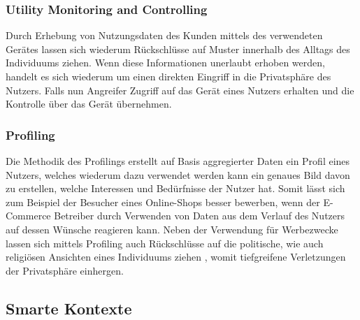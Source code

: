 \subsubsection{Utility Monitoring and Controlling}
\label{sec:Grundlagen:ssec:Gefahren für die Privatsphäre:sssec:Monitoring}

Durch Erhebung von Nutzungsdaten des Kunden mittels des verwendeten Gerätes lassen sich wiederum Rückschlüsse auf Muster innerhalb des Alltags des Individuums ziehen. Wenn diese Informationen unerlaubt erhoben werden, handelt es sich wiederum um einen direkten Eingriff in die Privatsphäre des Nutzers. Falls nun Angreifer Zugriff auf das Gerät eines Nutzers erhalten und die Kontrolle über das Gerät übernehmen.

\subsubsection{Profiling}
\label{sec:Grundlagen:ssec:Gefahren für die Privatsphäre:sssec:Profiling}

Die Methodik des Profilings erstellt auf Basis aggregierter Daten ein Profil eines Nutzers, welches wiederum dazu verwendet werden kann ein genaues Bild davon zu erstellen, welche Interessen und Bedürfnisse der Nutzer hat. Somit lässt sich zum Beispiel der Besucher eines Online-Shops besser bewerben, wenn der E-Commerce Betreiber durch Verwenden von Daten aus dem Verlauf des Nutzers auf dessen Wünsche reagieren kann. Neben der Verwendung für Werbezwecke lassen sich mittels Profiling auch Rückschlüsse auf die politische, wie auch religiösen Ansichten eines Individuums ziehen \cite{Seliem2018}, womit tiefgreifene Verletzungen der Privatsphäre einhergen.

\subsection{Smarte Kontexte}
\label{sec:Grundlagen:ssec:Smarte Kontexte}


